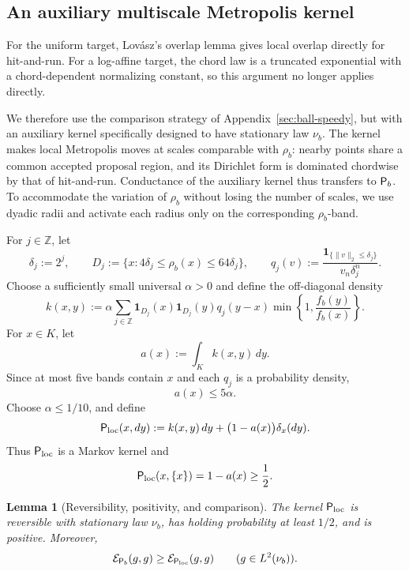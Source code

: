 \documentclass[11pt]{article}
\newtheorem{lemma}[theorem]{Lemma}
\theoremstyle{definition}
\theoremstyle{remark}
\newcommand{\one}{\mathbf 1}
\begin{document}
\subsection{An auxiliary multiscale Metropolis kernel}\label{app:multiscale_kernel}

For the uniform target, Lov\'asz's overlap lemma gives local overlap directly
for hit-and-run.  For a log-affine target, the chord law is a truncated
exponential with a chord-dependent normalizing constant, so this argument no
longer applies directly.

We therefore use the comparison strategy of
Appendix~\ref{sec:ball-speedy}, but with an auxiliary kernel specifically
designed to have stationary law $\nu_b$.  The kernel makes local Metropolis
moves at scales comparable with $\rho_b$: nearby points share a common
accepted proposal region, and its Dirichlet form is dominated chordwise by
that of hit-and-run.  Conductance of the auxiliary kernel thus transfers to
${\sf P}_b$. To accommodate the variation of $\rho_b$ without losing the number of scales, we use dyadic radii and activate each radius only on the corresponding $\rho_b$-band.

For $j\in\mathbb Z$, let
\begin{equation}\label{eq:log-affine-bands}
 \delta_j:=2^j,
 \qquad
 D_j:=\{x:4\delta_j\le\rho_b(x)\le64\delta_j\},
 \qquad
 q_j(v):=\frac{\one_{\{\|v\|_2\le\delta_j\}}}{v_n\delta_j^n}.
\end{equation}
Choose a sufficiently small universal $\alpha>0$ and define the off-diagonal density
\begin{equation}\label{eq:log-affine-local-kernel-density}
 k(x,y)
 :=
 \alpha\sum_{j\in\mathbb Z}
 \one_{D_j}(x)\one_{D_j}(y)q_j(y-x)
 \min\left\{1,\frac{f_b(y)}{f_b(x)}\right\}.
\end{equation}
For $x\in K$, let
\[
 a(x):=\int_K k(x,y)\,dy.
\]
Since at most five bands contain $x$ and each $q_j$ is a probability
density,
\[
 a(x)\le5\alpha.
\]
Choose $\alpha\le1/10$, and define
\begin{equation}\label{eq:log-affine-local-kernel}
 {\sf P}_{\rm loc}(x,dy)
 :=
 k(x,y)\,dy
 +
 \bigl(1-a(x)\bigr)\delta_x(dy).
\end{equation}
Thus ${\sf P}_{\rm loc}$ is a Markov kernel and
\[
 {\sf P}_{\rm loc}(x,\{x\})
 =
 1-a(x)\ge\frac12.
\]


\begin{lemma}[Reversibility, positivity, and comparison]
\label{lem:log-affine-local-kernel}
The kernel ${\sf P}_{\rm loc}$ is reversible with stationary law $\nu_b$, has holding probability at least $1/2$, and is positive.  Moreover,
\begin{equation}\label{eq:log-affine-dirichlet-domination}
 \mathcal E_{{\sf P}_b}(g,g)
 \ge
 \mathcal E_{{\sf P}_{\rm loc}}(g,g)
 \qquad(g\in L^2(\nu_b)).
\end{equation}
\end{lemma}
\end{document}
